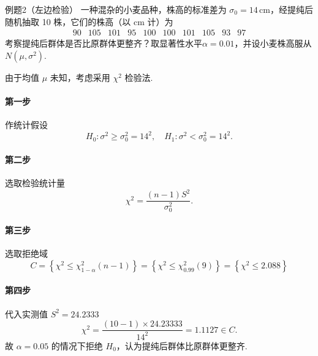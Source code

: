 \begin{question}{例题2（左边检验）}
    一种混杂的小麦品种，株高的标准差为 $\sigma_0 = 14 \,\mathrm{cm}$，经提纯后随机抽取 10 株，它们的株高（以 cm 计）为
    $$
        \begin{array}{cccccccccc}
            90 & 105 & 101 & 95 & 100 & 100 & 101 & 105 & 93 & 97
        \end{array}
    $$
    考察提纯后群体是否比原群体更整齐？取显著性水平$\alpha=0.01$，并设小麦株高服从 $N(\mu, \sigma^2)$.
\end{question}
\begin{solution}
    由于均值 $\mu$ 未知，考虑采用 $\chi^2$ 检验法.
    \paragraph{第一步} 作统计假设
    $$
        H_0: \sigma^2 \geqslant \sigma_0^2 = 14^2, \quad H_1: \sigma^2 < \sigma_0^2 = 14^2.
    $$
    \paragraph{第二步} 选取检验统计量
    $$
        \chi^2 = \frac{(n-1)S^2}{\sigma_0^2}.
    $$
    \paragraph{第三步} 选取拒绝域
    $$
        C = \left\{\chi^2 \leqslant \chi_{1-\alpha}^2(n-1)\right\}
        = \left\{\chi^2 \leqslant \chi_{0.99}^2(9)\right\}
        = \left\{\chi^2 \leqslant 2.088\right\}
    $$
    \paragraph{第四步} 代入实测值 $S^2 = 24.2333$
    $$
        \chi^2 = \frac{(10-1) \times 24.23333}{14^2} = 1.1127 \in C.
    $$
    故 $\alpha = 0.05$ 的情况下拒绝 $H_0$，认为提纯后群体比原群体更整齐.
\end{solution}




